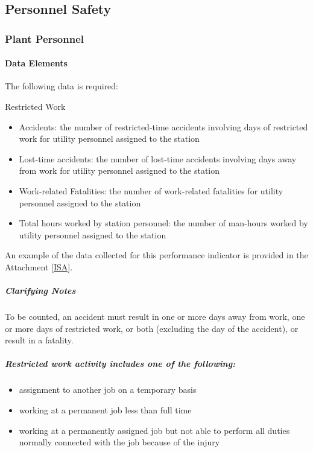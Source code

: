 \subsection{Personnel Safety}
\subsubsection{Plant Personnel}
\paragraph{Data Elements}
The following data is required:

Restricted Work

\begin{itemize}
\item  Accidents: the number of restricted-time accidents involving days of restricted work for utility personnel assigned to the station
\item Lost-time accidents: the number of lost-time accidents involving days away from work for utility personnel assigned to the station
\item Work-related Fatalities: the number of work-related fatalities for utility personnel assigned to the station
\item Total hours worked by station personnel: the number of man-hours
  worked by utility personnel assigned to the station
\end{itemize}

An example of the data collected for this performance indicator is
provided in the Attachment \ref{ISA}.

\subparagraph{Clarifying Notes}

To be counted, an accident must result in one or more days away from
work, one or more days of restricted work, or both (excluding the day
of the accident), or result in a fatality.

\subparagraph{Restricted work activity includes one of the following:}
\begin{itemize}
\item assignment to another job on a temporary basis
\item working at a permanent job less than full time
\item working at a permanently assigned job but not able to perform
  all duties normally connected with the job because of the injury
\end{itemize}

